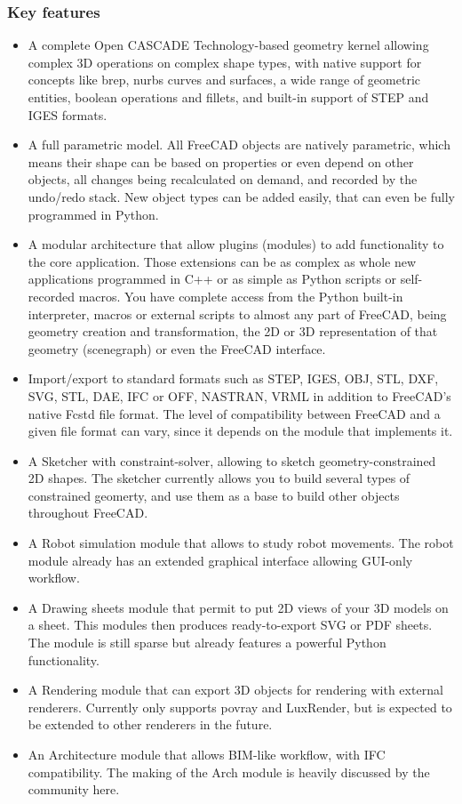 \subsubsection{Key features}
\begin{itemize}
\item A complete Open CASCADE Technology-based geometry kernel allowing 
complex 3D operations on complex shape types, with native support for 
concepts like brep, nurbs curves and surfaces, a wide range of geometric 
entities, boolean operations and fillets, and built-in support of STEP and 
IGES formats.
\item A full parametric model. All FreeCAD objects are natively parametric, 
which means their shape can be based on properties or even depend on other 
objects, all changes being recalculated on demand, and recorded by the 
undo/redo stack. New object types can be added easily, that can even be 
fully programmed in Python.
\item A modular architecture that allow plugins (modules) to add functionality
to the core application. Those extensions can be as complex as whole new
applications programmed in C++ or as simple as Python scripts or self-recorded
macros. You have complete access from the Python built-in interpreter,
macros or external scripts to almost any part of FreeCAD, being geometry 
creation and transformation, the 2D or 3D representation of that geometry 
(scenegraph) or even the FreeCAD interface.
\item Import/export to standard formats such as STEP, IGES, OBJ, STL, DXF, 
SVG, STL, DAE, IFC or OFF, NASTRAN, VRML in addition to FreeCAD's native 
Fcstd file format. The level of compatibility between FreeCAD and a given 
file format can vary, since it depends on the module that implements it.
\item A Sketcher with constraint-solver, allowing to sketch geometry-constrained 
2D shapes. The sketcher currently allows you to build several types of 
constrained geomerty, and use them as a base to build other objects throughout 
FreeCAD.
\item A Robot simulation module that allows to study robot movements. The 
robot module already has an extended graphical interface allowing GUI-only 
workflow.
\item A Drawing sheets module that permit to put 2D views of your 3D 
models on a sheet. This modules then produces ready-to-export SVG or PDF 
sheets. The module is still sparse but already features a powerful Python 
functionality.
\item A Rendering module that can export 3D objects for rendering with 
external renderers. Currently only supports povray and LuxRender, but is 
expected to be extended to other renderers in the future.
\item An Architecture module that allows BIM-like workflow, with IFC 
compatibility. The making of the Arch module is heavily discussed by the 
community here.
\end{itemize}


